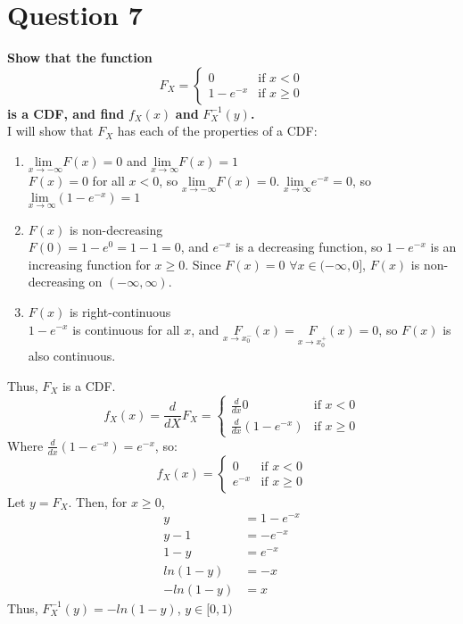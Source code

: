 \documentclass{article}
\newcommand{\lmt}{\underset{x\rightarrow\infty}{\text{lim }}}
\newcommand{\neglmt}{\underset{x\rightarrow-\infty}{\text{lim }}}
\begin{document}
\section*{Question 7}
\textbf{Show that the function}\[F_X=\begin{cases}0 &\text{if } x<0 \\ 1-e^{-x} &\text{if } x\geq 0\end{cases}\]\textbf{is a CDF, and find } $f_X(x)$ \textbf{and} $F_X^{-1}(y)$\textbf{.}
\medskip \\
I will show that $F_X$ has each of the properties of a CDF:
\begin{enumerate}
	\item $\neglmt F(x)= 0$ and $\lmt F(x)= 1$
	\smallskip \\
	$F(x)=0$ for all $x<0$, so $\neglmt F(x)= 0$. $\lmt e^{-x} = 0$, so  $\lmt(1-e^{-x})= 1$
	
	\item $F(x)$ is non-decreasing
	\smallskip \\
	$F(0)=1-e^0=1-1=0$, and $e^{-x}$ is a decreasing function, so $1-e^{-x}$ is an increasing function for $x\geq 0$. Since $F(x)=0$ $\forall x\in(-\infty,0]$, $F(x)$ is non-decreasing on $(-\infty,\infty)$.
	
	\item $F(x)$ is right-continuous
	\smallskip \\
	$1-e^{-x}$ is continuous for all $x$, and $\underset{x\rightarrow x_0^-}F(x)=\underset{x\rightarrow x_0^+}F(x)=0$, so $F(x)$ is also continuous.
	
\end{enumerate}
Thus, $F_X$ is a CDF.
\medskip \\
\[
	f_X(x)=\frac{d}{dX} F_X=  \begin{cases}\frac{d}{dx} 0 &\text{if } x<0 \\ \frac{d}{dx} (1-e^{-x}) &\text{if } x\geq 0\end{cases}
\]
Where $\frac{d}{dx} (1-e^{-x})=e^{-x}$, so:
\[
	f_X(x)=\begin{cases}0 &\text{if } x<0 \\ e^{-x} &\text{if } x\geq 0\end{cases}
\]
Let $y=F_X$. Then, for $x\geq 0$,
\begin{align*}
	y			&= 1-e^{-x}	\\
	y-1			&= -e^{-x}	\\
	1-y			&= e^{-x}	\\
	ln(1-y)		&= -x 		\\
	-ln(1-y)	&= x
\end{align*}
Thus, $F_X^{-1}(y) = -ln(1-y)$, $y\in[0,1)$

\end{document}
